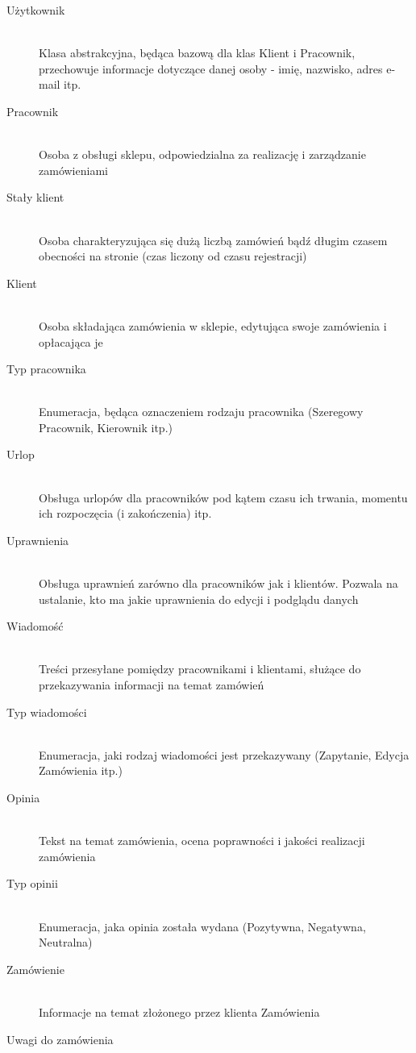 \begin{description}
	\item[Użytkownik] \hfill \\
		Klasa abstrakcyjna, będąca bazową dla klas Klient i Pracownik, przechowuje
		informacje dotyczące danej osoby - imię, nazwisko, adres e-mail itp.
	\item[Pracownik] \hfill \\
	 	Osoba z obsługi sklepu, odpowiedzialna za realizację i zarządzanie
	 	zamówieniami
	\item[Stały klient] \hfill \\
		Osoba charakteryzująca się dużą liczbą zamówień bądź długim czasem obecności
		na stronie (czas liczony od czasu rejestracji)
	\item[Klient] \hfill \\
		Osoba składająca zamówienia w sklepie, edytująca swoje zamówienia i opłacająca
		je
	\item[Typ pracownika] \hfill \\
		Enumeracja, będąca oznaczeniem rodzaju pracownika (Szeregowy Pracownik,
		Kierownik itp.)
	\item[Urlop] \hfill \\
		Obsługa urlopów dla pracowników pod kątem czasu ich trwania, momentu ich
		rozpoczęcia (i zakończenia) itp.
	\item[Uprawnienia] \hfill \\
		Obsługa uprawnień zarówno dla pracowników jak i klientów. Pozwala na
		ustalanie, kto ma jakie uprawnienia do edycji i podglądu danych
	\item[Wiadomość] \hfill \\
		Treści przesyłane pomiędzy pracownikami i klientami, służące do przekazywania
		informacji na temat zamówień
	\item[Typ wiadomości] \hfill \\
		Enumeracja, jaki rodzaj wiadomości jest przekazywany (Zapytanie, Edycja
		Zamówienia itp.)
	\item[Opinia] \hfill \\
		Tekst na temat zamówienia, ocena poprawności i jakości realizacji zamówienia
	\item[Typ opinii] \hfill \\
		Enumeracja, jaka opinia została wydana (Pozytywna, Negatywna, Neutralna)
	\item[Zamówienie] \hfill \\
		Informacje na temat złożonego przez klienta Zamówienia
	\item[Uwagi do zamówienia] \hfill \\

\end{description}
